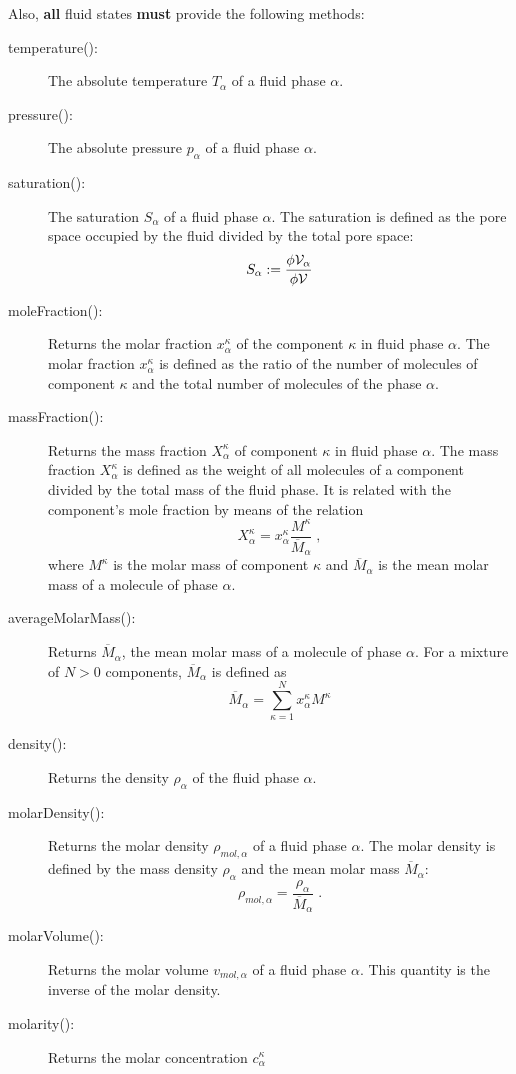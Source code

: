 Also, {\bf all} fluid states {\bf must} provide the following methods:
\begin{description}
\item[temperature():] The absolute temperature $T_\alpha$ of
  a fluid phase $\alpha$.
\item[pressure():] The absolute pressure $p_\alpha$ of a
  fluid phase $\alpha$.
\item[saturation():] The saturation $S_\alpha$ of a fluid phase
  $\alpha$. The saturation is defined as the pore space occupied by
  the fluid divided by the total pore space:
  \[
  S_\alpha := \frac{\phi \mathcal{V}_\alpha}{\phi \mathcal{V}}
  \]
\item[moleFraction():] Returns the molar fraction $x^\kappa_\alpha$ of
  the component $\kappa$ in fluid phase $\alpha$. The molar fraction
  $x^\kappa_\alpha$ is defined as the ratio of the number of molecules
  of component $\kappa$ and the total number of molecules of the phase
  $\alpha$.
\item[massFraction():] Returns the mass fraction $X^\kappa_\alpha$ of
  component $\kappa$ in fluid phase $\alpha$. The mass fraction
  $X^\kappa_\alpha$ is defined as the weight of all molecules of a
  component divided by the total mass of the fluid phase. It is
  related with the component's mole fraction by means of the relation
  \[
  X^\kappa_\alpha = x^\kappa_\alpha \frac{M^\kappa}{\overline M_\alpha}\;,
  \]
  where $M^\kappa$ is the molar mass of component $\kappa$ and
  $\overline M_\alpha$ is the mean molar mass of a molecule of phase
  $\alpha$.
\item[averageMolarMass():] Returns $\overline M_\alpha$, the mean
  molar mass of a molecule of phase $\alpha$. For a mixture of $N > 0$
  components, $\overline M_\alpha$ is defined as
  \[
  \overline M_\alpha = \sum_{\kappa=1}^{N} x^\kappa_\alpha M^\kappa
  \]
\item[density():] Returns the density $\rho_\alpha$ of the fluid phase
  $\alpha$.
\item[molarDensity():] Returns the molar density $\rho_{mol,\alpha}$
  of a fluid phase $\alpha$. The molar density is defined by the mass
  density $\rho_\alpha$ and the mean molar mass $\overline M_\alpha$:
  \[
  \rho_{mol,\alpha} = \frac{\rho_\alpha}{\overline M_\alpha} \;.
  \]
\item[molarVolume():] Returns the molar volume $v_{mol,\alpha}$ of a
  fluid phase $\alpha$. This quantity is the inverse of the molar
  density.
\item[molarity():] Returns the molar concentration $c^\kappa_\alpha$

\end{description}
